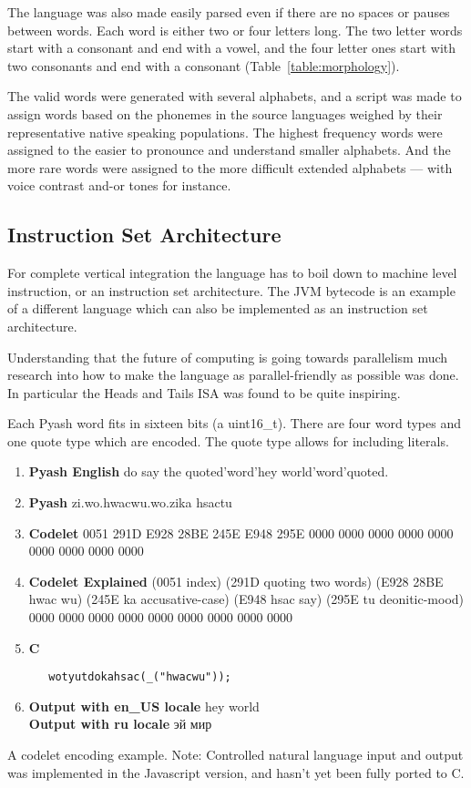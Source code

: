 The language was also made easily parsed even if there are no spaces or pauses 
between words. Each word is either two or four letters long. The two letter
words start with a consonant and end with a vowel, and the four letter
ones start with two consonants and end with a consonant (Table~\ref{table:morphology}). 

The valid words were generated with several alphabets, and a script was made to
assign words based on the phonemes in the source languages weighed 
by their representative native speaking populations. The highest frequency 
words were assigned to the easier to pronounce and understand smaller alphabets.
And the more rare words were assigned to the more difficult extended alphabets ---
with voice contrast and-or tones for instance.

\subsection{Instruction Set Architecture}\label{ISA}
For complete vertical integration the language has to boil down to machine level
instruction, or an instruction set architecture. 
The JVM bytecode is an example of a different language which can also be
implemented as an instruction set architecture\cite{JOP}.

Understanding that the future of computing is going towards parallelism 
much research into how to make the language as parallel-friendly as possible was
done. 
In particular the Heads and Tails ISA\cite{headsTails} was found to be quite
inspiring. 

Each Pyash word fits in sixteen bits (a uint16\_t). There are four
word types and one quote type which are encoded. The quote type allows for
including literals. 


\begin{table}
  \begin{enumerate}
    \item \textbf{Pyash English}
    do say the quoted'word'hey world'word'quoted. 
  \item \textbf{Pyash} zi.wo.hwacwu.wo.zika hsactu  
  \item \textbf{Codelet}
   0051 291D E928 28BE  245E E948 295E 0000  0000 0000 0000 0000  0000 0000 0000 0000
 \item \textbf{Codelet Explained}
   (0051 index) (291D quoting two words) (E928 28BE hwac wu)  (245E ka
      accusative-case) (E948 hsac say) (295E tu deonitic-mood) 0000  0000 0000 0000 0000  0000 0000 0000 0000
    \item \textbf{C}
   \begin{lstlisting} 
   wotyutdokahsac(_("hwacwu"));
   \end{lstlisting} 
 \item \textbf{Output with en\_US locale} hey world \\
  \textbf{Output with ru locale} эй мир
  \end{enumerate}
\caption{A codelet encoding example.
  Note: Controlled natural language input and output was implemented in the 
  Javascript version\cite{speljs}, and hasn't yet been fully ported to C.
  }\label{table:codelet}
\end{table}


